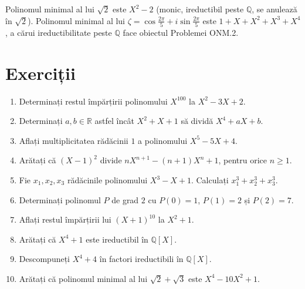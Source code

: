 \begin{exemplu}
Polinomul minimal al lui $\sqrt{2}$ este $X^2 - 2$ (monic, ireductibil peste $\mathbb{Q}$, se anulează în $\sqrt 2$). Polinomul minimal al lui $\zeta=\cos\frac{2\pi}{5}+i\sin\frac{2\pi}{5}$ este $1+X+X^2+X^3+X^4$, a cărui ireductibilitate peste $\mathbb{Q}$ face obiectul Problemei ONM.2.
\end{exemplu}

\section{Exerciții}

\begin{enumerate}[label=\textbf{\arabic*.},leftmargin=*]
\item Determinați restul împărțirii polinomului $X^{100}$ la $X^2 - 3X + 2$.
\item Determinați $a, b \in \mathbb{R}$ astfel încât $X^2 + X + 1$ să dividă $X^4 + aX + b$.
\item Aflați multiplicitatea rădăcinii $1$ a polinomului $X^5 - 5X + 4$.
\item Arătați că $(X-1)^2$ divide $nX^{n+1} - (n+1)X^n + 1$, pentru orice $n \ge 1$.
\item Fie $x_1, x_2, x_3$ rădăcinile polinomului $X^3 - X + 1$. Calculați $x_1^3 + x_2^3 + x_3^3$.
\item Determinați polinomul $P$ de grad $2$ cu $P(0) = 1$, $P(1) = 2$ și $P(2) = 7$.
\item Aflați restul împărțirii lui $(X+1)^{10}$ la $X^2 + 1$.
\item Arătați că $X^4 + 1$ este ireductibil în $\mathbb{Q}[X]$.
\item Descompuneți $X^4 + 4$ în factori ireductibili în $\mathbb{Q}[X]$.
\item Arătați că polinomul minimal al lui $\sqrt{2} + \sqrt{3}$ este $X^4 - 10X^2 + 1$.
\end{enumerate}

